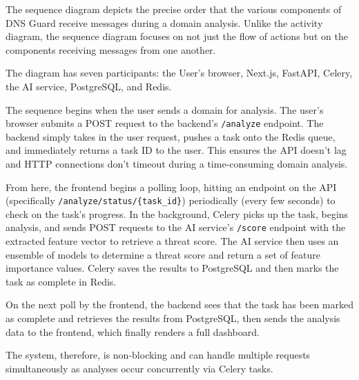 \documentclass[12pt, a4paper, oneside]{report}
\begin{document}
The sequence diagram depicts the precise order that the various components of DNS Guard receive messages during a domain analysis. Unlike the activity diagram, the sequence diagram focuses on not just the flow of actions but on the components receiving messages from one another.

The diagram has seven participants: the User's browser, Next.js, FastAPI, Celery, the AI service, PostgreSQL, and Redis.

The sequence begins when the user sends a domain for analysis. The user's browser submits a POST request to the backend's \texttt{/analyze} endpoint. The backend simply takes in the user request, pushes a task onto the Redis queue, and immediately returns a task ID to the user. This ensures the API doesn't lag and HTTP connections don't timeout during a time-consuming domain analysis.

From here, the frontend begins a polling loop, hitting an endpoint on the API (specifically \texttt{/analyze/status/\{task\_id\}}) periodically (every few seconds) to check on the task's progress. In the background, Celery picks up the task, begins analysis, and sends POST requests to the AI service's \texttt{/score} endpoint with the extracted feature vector to retrieve a threat score. The AI service then uses an ensemble of models to determine a threat score and return a set of feature importance values. Celery saves the results to PostgreSQL and then marks the task as complete in Redis.

On the next poll by the frontend, the backend sees that the task has been marked as complete and retrieves the results from PostgreSQL, then sends the analysis data to the frontend, which finally renders a full dashboard.

The system, therefore, is non-blocking and can handle multiple requests simultaneously as analyses occur concurrently via Celery tasks.

%

\end{document}
